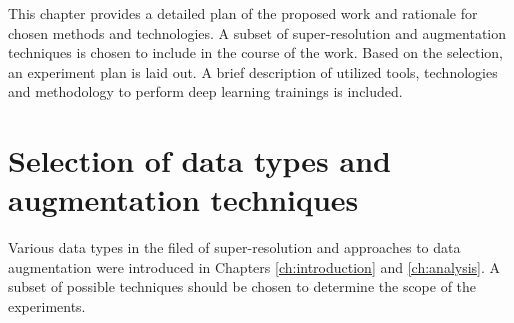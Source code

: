 This chapter provides a detailed plan of the proposed work and rationale for chosen methods and technologies.
A subset of super-resolution and augmentation techniques is chosen to include in the course of the work.
Based on the selection, an experiment plan is laid out.
A brief description of utilized tools, technologies and methodology to perform deep learning trainings is included.

\section{Selection of data types and augmentation techniques}
Various data types in the filed of super-resolution and approaches to data augmentation were introduced in Chapters \ref{ch:introduction} and \ref{ch:analysis}.
A subset of possible techniques should be chosen to determine the scope of the experiments.

